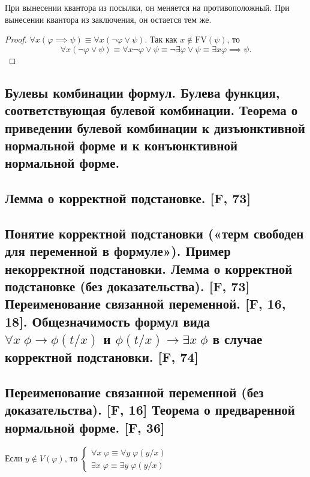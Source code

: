 \documentclass[a4paper, fleqn]{article}
\begin{document}
    При вынесении квантора из посылки, он меняется на противоположный.
    При вынесении квантора из заключения, он остается тем же.
    
    \begin{proof}
        $\forall x (\varphi \implies \psi) \equiv \forall x (\neg \varphi \lor \psi)$.
        Так как $x \notin \text{FV}(\psi)$, то
        $$
            \forall x (\neg \varphi \lor \psi) \equiv \forall x \neg \varphi \lor 
            \psi \equiv \neg \exists \varphi \lor \psi \equiv \exists x \varphi 
            \implies \psi.
        $$
    \end{proof}

    \subsection{Булевы комбинации формул. Булева функция, соответствующая булевой комбинации. Теорема о приведении булевой комбинации к дизъюнктивной нормальной форме и к конъюнктивной нормальной форме.}

    \subsection{Лемма о корректной подстановке. [F, 73]}

    \subsection{Понятие корректной подстановки («терм свободен для переменной в формуле»). Пример некорректной подстановки. Лемма о корректной подстановке (без доказательства). [F, 73] Переименование связанной переменной. [F, 16, 18]. Общезначимость формул вида $\forall x \; \phi \to \phi(t/x)$ и $\phi(t/x) \to \exists x \; \phi$ в случае корректной подстановки. [F, 74]}

    \subsection{Переименование связанной переменной (без доказательства). [F, 16] Теорема о предваренной нормальной форме. [F, 36]}
    \begin{proposition}

        Если $y \notin V(\varphi)$, то $\begin{cases}
        \forall x \; \varphi \equiv \forall y \; \varphi(y/x) \\
        \exists x \; \varphi \equiv \exists y \; \varphi(y/x)
        \end{cases}$
    \end{proposition}
\end{document}
